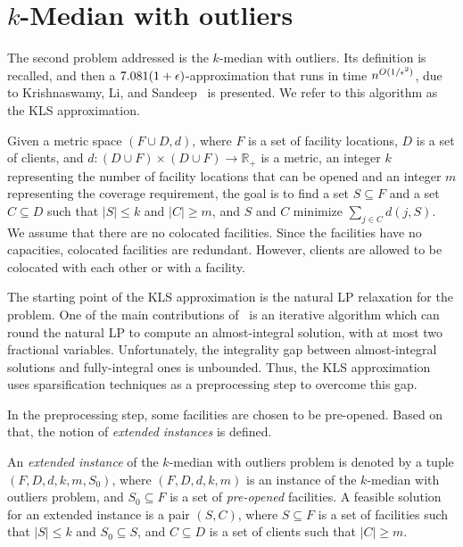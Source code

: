 \chapter{$k$-Median with outliers}
\label{cap:kmedout}
The second problem addressed is the $k$-median with outliers. Its definition is recalled, and then a $7.081(1 + \epsilon)$-approximation that runs in time $n^{O(1/\epsilon^2)}$, due to Krishnaswamy, Li, and Sandeep~\cite{KLS2018} is presented. We refer to this algorithm as the KLS approximation.

\begin{problem}
Given a metric space $(F \cup D,d)$, where $F$ is a set of facility locations, $D$ is a set of clients, and $d : (D \cup F) \times (D \cup F) \to \mathbb{R}_+$ is a metric, an integer $k$ representing the number of facility locations that can be opened and an integer $m$ representing the coverage requirement, the goal is to find a set $S \subseteq F$ and a set $C \subseteq D$ such that $|S| \le k$ and $|C| \geq m$, and $S$ and $C$ minimize $\sum_{j \in C} d(j,S)$.
We assume that there are no colocated facilities. Since the facilities have no capacities, colocated facilities are redundant. However, clients are allowed to be colocated with each other or with a facility.
\end{problem}

The starting point of the KLS approximation is the natural LP relaxation for the problem. One of the main contributions of~\cite{KLS2018} is an iterative algorithm which can round the natural LP to compute an almost-integral solution, with at most two fractional variables. Unfortunately, the integrality gap between almost-integral solutions and fully-integral ones is unbounded. Thus, the KLS approximation uses sparsification techniques as a preprocessing step to overcome this gap.

In the preprocessing step, some facilities are chosen to be pre-opened. Based on that, the notion of \emph{extended instances} is defined.

\begin{definition}
An \emph{extended instance} of the $k$-median with outliers problem is denoted by a tuple $(F, D, d, k, m, S_0)$, where $(F, D, d, k, m)$ is an instance of the $k$-median with outliers problem, and $S_0 \subseteq F$ is a set of \emph{pre-opened} facilities. A feasible solution for an extended instance is a pair $(S, C)$, where $S \subseteq F$ is a set of facilities such that $|S| \leq k$ and $S_0 \subseteq S$, and $C \subseteq D$ is a set of clients such that $|C| \geq m$.
\end{definition}

